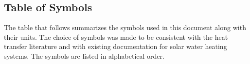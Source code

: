 \documentclass[12pt]{article}
\begin{document}




\subsection{Table of Symbols}

The table that follows summarizes the symbols used in this document along with
their units.  The choice of symbols was made to be consistent with the heat
transfer literature and with existing documentation for solar water heating
systems.  The symbols are listed in alphabetical order.
\end{document}
